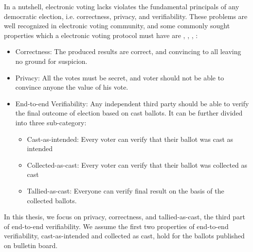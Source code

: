 	\noindent
	In a  nutshell, 
    electronic voting lacks violates the  fundamental principals of any democratic election, i.e.
    correctness, privacy, and verifiability. These problems are well recognized in electronic voting 
    community, 
   and some commonly sought 
   properties which a electronic voting protocol must have are 
    \citep{5958051}, 
   \citep{Benaloh:1994:RSE:195058.195407},  \citep{Delaune:2010:VPT}, \citep{Bernhard:2017:PES}:
 \begin{itemize}
 
  \item Correctness:
 	The produced results are correct, and convincing to all leaving no  ground for suspicion. 
 	
 \item Privacy:
    All the votes must be secret, and voter should not be able to convince anyone the 
    value of his vote.
 
 \item End-to-end Verifiability:
 Any independent third party should be able to verify the final outcome of election based on cast 
 ballots.  It can be further divided into three sub-category:
 
 \begin{itemize}
  \item Cast-as-intended: Every voter can verify that their ballot was cast as
  intended
  \item Collected-as-cast: Every voter can verify that their ballot was collected as
  cast
  \item Tallied-as-cast: Everyone can verify final result on the basis of the
  collected ballots.
\end{itemize}
\end{itemize}
 	
   
In this thesis, we focus on privacy, correctness, and tallied-as-cast, the third part of end-to-end verifiability.
We assume the first two properties of end-to-end verifiability, cast-as-intended and collected as cast, hold
for the ballots published on bulletin board. 

